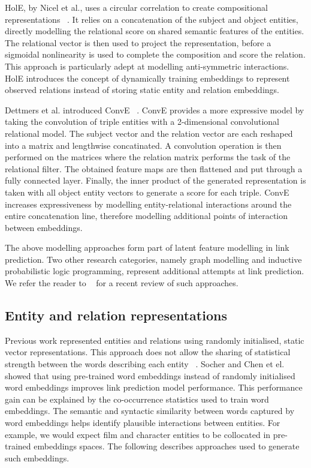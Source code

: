 \noindent HolE, by Nicel et al., uses a  circular correlation to create compositional representations \unskip~\citep{nickel2016holographic}. It relies on a concatenation of the subject and object entities, directly modelling the relational score on shared semantic features of the entities. The relational vector is then used to project the representation, before a sigmoidal nonlinearity is used to complete the composition and score the relation. This approach is particularly adept at modelling anti-symmetric interactions. HolE introduces the concept of dynamically training embeddings to represent observed relations instead of storing static entity and relation embeddings. \par

\noindent Dettmers et al. introduced ConvE \unskip~\citep{dettmers2018convolutional}. ConvE provides a more expressive model by taking the convolution of triple entities with a 2-dimensional convolutional relational model. The subject vector and the relation vector are each reshaped into a matrix and lengthwise concatinated. A convolution operation is then performed on the matrices where the relation matrix performs the task of the relational filter. The obtained feature maps are then flattened and put through a fully connected layer. Finally, the inner product of the generated representation is taken with all object entity vectors to generate a score for each triple. ConvE  increases expressiveness by modelling entity-relational interactions  around the entire concatenation line, therefore modelling additional points of interaction between embeddings. \par

\noindent The above modelling approaches form part of latent feature modelling in link prediction. Two other research categories, namely graph modelling and inductive probabilistic logic programming, represent additional attempts at link prediction. We refer the reader to \unskip~\citep{nickel2015review} for a recent review of such approaches. \par

\subsection{Entity and relation representations} 

\noindent Previous work represented entities and relations using randomly initialised, static vector representations. This approach does not allow the sharing of statistical strength between the words describing each entity \unskip~\citep{socher2013reasoning}. Socher and Chen et el. showed that using pre-trained word embeddings instead of randomly initialised word embeddings improves link prediction model performance. This performance gain can be explained by the co-occurrence statistics used to train word embeddings. The semantic and syntactic similarity between words captured by word embeddings helps identify plausible interactions between entities. For example, we would expect film and character entities to be collocated in pre-trained embeddings spaces. The following describes approaches used to generate such embeddings. \par

